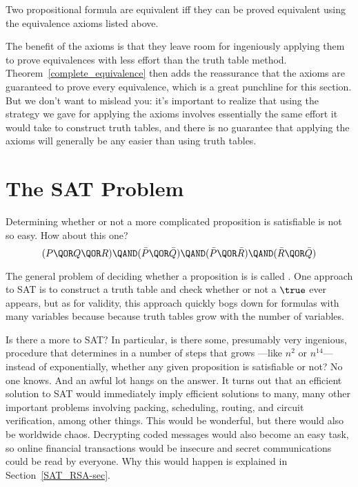 \begin{theorem}
\label{complete_equivalence}
Two propositional formula are equivalent iff they can be proved
equivalent using the equivalence axioms listed above.
\end{theorem}

The benefit of the axioms is that they leave room for ingeniously
applying them to prove equivalences with less effort than the truth
table method.  Theorem~\ref{complete_equivalence} then adds the
reassurance that the axioms are guaranteed to prove every equivalence,
which is a great punchline for this section.  But we don't want to
mislead you: it's important to realize that using the strategy we gave
for applying the axioms involves essentially the same effort it would
take to construct truth tables, and there is no guarantee that applying the
axioms will generally be any easier than using truth tables.

\begin{problems}
\practiceproblems
{}

\classproblems
{}

\homeworkproblems
{}

\end{problems}

\section{The SAT Problem}\label{SAT_sec}
Determining whether or not a more complicated proposition is
satisfiable is not so easy.  How about this one?
%
\[
(P \QOR Q \QOR R) \QAND (\bar P \QOR \bar Q)
                  \QAND (\bar P \QOR \bar R)
                  \QAND (\bar R \QOR \bar Q)
\]

The general problem of deciding whether a proposition is 
is called .  One approach to SAT is to construct a truth table
and check whether or not a $\true$ ever appears, but as for validity, this
approach quickly bogs down for formulas with many variables because
because truth tables grow  with the number of
variables.

Is there a more  to SAT?  In particular, is
there some, presumably very ingenious, procedure that determines in a
number of steps that grows \emph{}---like $n^2$ or $n^{14}$---instead of
exponentially, whether any given proposition is satisfiable or not?
No one knows.  And an awful lot hangs on the answer.  It turns out
that an efficient solution to SAT would immediately imply efficient
solutions to many, many other important problems involving packing,
scheduling, routing, and circuit verification, among other things.
This would be wonderful, but there would also be worldwide chaos.
Decrypting coded messages would also become an easy task, so online
financial transactions would be insecure and secret communications
could be read by everyone.  Why this would happen is explained in
Section~\ref{SAT_RSA-sec}.

